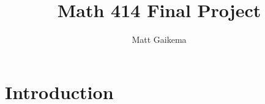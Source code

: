 \documentclass{article}
\title{Math 414 Final Project}
\author{Matt Gaikema}
\date{}
\begin{document}
\maketitle

\section{Introduction}
\end{document}
